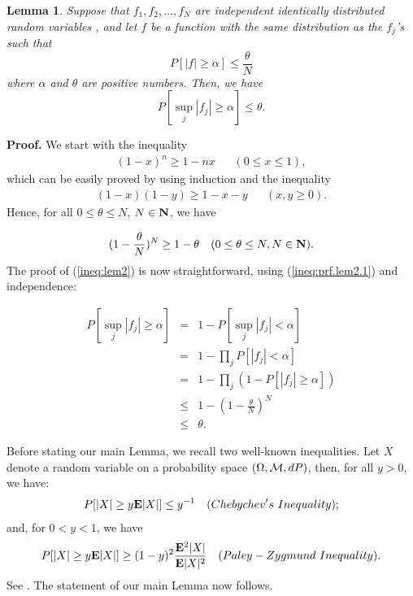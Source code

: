 \newtheorem{lem:2}[lem:1]{Lemma}
\begin{lem:2}
Suppose that $f_1 , f_2, \ldots, f_N$ are independent identically
distributed random variables , and let $f$ be a function with the same
distribution as the $f_j$'s such that
$$
P[ |f| \geq \alpha ] \leq \frac{\theta}{N}
$$
where $\alpha$ and $\theta$ are positive numbers.  Then, we have
\begin{equation}
P[ \sup_j|f_j| \geq \alpha ] \leq \theta .
\label{ineq:lem2}
\end{equation}
\label{lem:2}
\end{lem:2}

{\bf Proof.}  We start with the inequality
\begin{eqnarray*}
(1 - x)^n \geq 1 - nx &  & ( 0\le x \le 1),
\end{eqnarray*}
which can be easily proved by using induction and the inequality
\begin{eqnarray*}
(1 - x)(1 - y) \geq 1 - x - y &  & (x , y \geq 0).
\end{eqnarray*}
Hence, for all $0\le \theta \le N$, $N\in{\hbox{\bf N}}$, we have




\begin{eqnarray}
(1 - \frac{\theta}{N})^N \geq 1 - \theta &  & (0\le \theta \le N, N\in{\hbox{\bf N}}
).
\label{ineq:prf.lem2.1}
\end{eqnarray}
The proof of (\ref{ineq:lem2}) is now straightforward, using
(\ref{ineq:prf.lem2.1}) and independence:

\begin{eqnarray*}
P[\sup_j |f_j| \geq \alpha ]     & = &   1 - P[\sup_j |f_j| < \alpha ] \\
                                 & = &   1 -\prod_j P[|f_j| < \alpha ] \\
                                 & = &  1 - \prod_j(1- P[ |f_j|\geq\alpha
                                                                   ] ) \\
                                & \leq &  1 - (1 - \frac{\theta}{N})^N \\
                                & \leq & \theta .
\end{eqnarray*}

Before stating our main Lemma, we recall two well-known inequalities.
Let $X$ denote a random variable on a probability space $(\Omega, {\cal
M}, dP)$, then, for all $y > 0$, we have:
\begin{eqnarray}
P[|X| \geq y{\bf E}|X|] \leq y^{-1} & & (Chebychev's\ Inequality);
\label{ineq:Cheb}
\end{eqnarray}
and, for $0 < y < 1$, we have
\begin{eqnarray}
P[|X| \geq y{\bf E}|X|] \geq (1 - y)^2\frac{{\bf E}^2|X|}{{\bf E}|X|^2}
                        & & (Paley-Zygmund\ Inequality).
\label{ineq:PZ}
\end{eqnarray}
See \cite[Ineq. II, p. 8]{bib:Ka}.
The statement of our main Lemma now follows. \\

